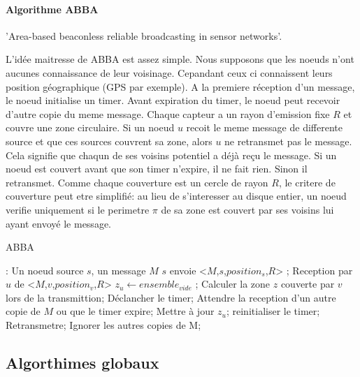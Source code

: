 \paragraph{Algorithme ABBA}
'Area-based beaconless reliable broadcasting in
sensor networks'\cite{Abba2006}.

L'idée maitresse de ABBA est assez simple. Nous supposons que les noeuds n'ont aucunes connaissance de leur voisinage. Cepandant ceux ci connaissent leurs position géographique (GPS par exemple).
A la premiere réception d'un message, le noeud initialise un timer. Avant expiration du timer, le noeud peut recevoir d'autre copie du meme message. Chaque capteur a un rayon d'emission fixe $R$
et couvre une zone circulaire.
 Si un noeud $u$ recoit le meme message de differente source et que ces sources couvrent sa zone, alors $u$ ne retransmet pas le message.
Cela signifie que chaqun de ses voisins potentiel a déjà reçu le message. Si un noeud est couvert avant que son timer n'expire, il ne fait rien. Sinon il retransmet.
Comme chaque couverture est un cercle de rayon $R$, le critere de couverture peut etre simplifié: au lieu de s'interesser au disque entier, un noeud verifie uniquement si le perimetre $\pi$ de sa zone est couvert par 
ses voisins lui ayant envoyé le message. 

\begin{algorithm}[h]
\caption{ABBA}
\label{ABBA}
\begin{algorithmic}
\REQUIRE:
Un noeud source $s$, un message $M$
\STATE $s$ envoie  <$M$,$s$,$position_s$,$R$> ;
\STATE Reception  par  $u$ de  <$M$,$v$,$position_v$,$R$>
\STATE $z_u\leftarrow ensemble_{vide}$ ;
\STATE Calculer la zone $z$ couverte par $v$ lors de la transmittion;
\STATE Déclancher le timer;
\REPEAT
    \STATE Attendre la reception d'un autre copie de $M$ ou que le timer expire;
	\STATE Mettre à jour $z_u$;
	\STATE reinitialiser le timer;
    \ENDIF
{}
    \STATE Retransmetre;
\ENDIF
     \STATE Ignorer les autres copies de M;

\end{algorithmic}
\end{algorithm}


\subsection{Algorthimes globaux}
